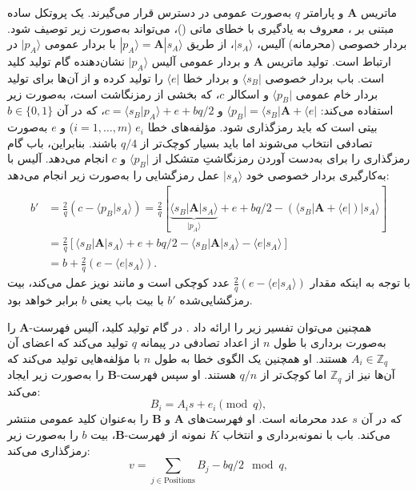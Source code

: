 ماتریس $\bm{A}$ و پارامتر $q$ به‌صورت عمومی در دسترس قرار می‌گیرند. یک پروتکل ساده مبتنی بر ، معروف به یادگیری با خطای ماتی ()، می‌تواند به‌صورت زیر توصیف شود. بردار خصوصی (محرمانه) آلیس، $|s_A\rangle$، از طریق $|p_A\rangle = \bm{A}|s_A\rangle$ با بردار عمومی $|p_A\rangle$ در ارتباط است. تولید ماتریس $\bm{A}$ و بردار عمومی آلیس $|p_A\rangle$ نشان‌دهنده گام تولید کلید است. باب بردار خصوصی $\langle s_B|$ و بردار خطا $\langle e|$ را تولید کرده و از آن‌ها برای تولید بردار خام عمومی $\langle p_B|$ و اسکالر $c$، که بخشی از رمزنگاشت است، به‌صورت زیر استفاده می‌کند: $\langle p_B| = \langle s_B|\bm{A} + \langle e|$ و $c = \langle s_B|p_A\rangle + e + bq/2$، که در آن $b \in \{0,1\}$ بیتی است که باید رمزگذاری شود. مؤلفه‌های خطا $e_i$ ($i = 1, \dots, m$) و $e$ به‌صورت تصادفی انتخاب می‌شوند اما باید بسیار کوچک‌تر از $q/4$ باشند. بنابراین، باب گام رمزگذاری را برای به‌دست آوردن رمزنگاشتِ متشکل از $\langle p_B|$ و $c$ انجام می‌دهد. آلیس با به‌کارگیری بردار خصوصی خود $|s_A\rangle$ عمل رمزگشایی را به‌صورت زیر انجام می‌دهد:
\begin{equation}
	\begin{aligned}
		b' &= \frac{2}{q} (c - \langle p_B|s_A\rangle) = \frac{2}{q} \left[ \underbrace{\langle s_B|\bm{A}|s_A\rangle}_{|p_A\rangle} + e + bq/2 - (\langle s_B|\bm{A} + \langle e|) |s_A\rangle \right] \\
		&= \frac{2}{q} [\langle s_B|\bm{A}|s_A\rangle + e + bq/2 - \langle s_B|\bm{A}|s_A\rangle - \langle e|s_A\rangle] \\
		&= b + \frac{2}{q} (e - \langle e|s_A\rangle).
	\end{aligned}
	\label{eq:12-2}
\end{equation}
با توجه به اینکه مقدار $\frac{2}{q}(e - \langle e|s_A\rangle)$ عدد کوچکی است و مانند نویز عمل می‌کند، بیت رمزگشایی‌شده $b'$ با بیت باب یعنی $b$ برابر خواهد بود.

همچنین می‌توان تفسیر زیر را ارائه داد \cite{12-22}. در گام تولید کلید، آلیس فهرست-$\bm{A}$ را به‌صورت برداری با طول $n$ از اعداد تصادفی در پیمانه $q$ تولید می‌کند که اعضای آن $A_i \in \mathbb{Z}_q$ هستند. او همچنین یک الگوی خطا به طول $n$ با مؤلفه‌هایی تولید می‌کند که آن‌ها نیز از $\mathbb{Z}_q$ اما کوچک‌تر از $q/n$ هستند. او سپس فهرست-$\bm{B}$ را به‌صورت زیر ایجاد می‌کند:
\begin{equation}
	B_i = A_i s + e_i \pmod q,
	\label{eq:12-3}
\end{equation}
که در آن $s$ عدد محرمانه است. او فهرست‌های $\bm{A}$ و $\bm{B}$ را به‌عنوان کلید عمومی منتشر می‌کند. باب با نمونه‌برداری و انتخاب $K$ نمونه از فهرست-$\bm{B}$، بیت $b$ را به‌صورت زیر رمزگذاری می‌کند:
\begin{equation}
	v = \sum_{j \in \text{Positions}} B_j - bq/2 \mod q,
	\label{eq:12-4}
\end{equation}

